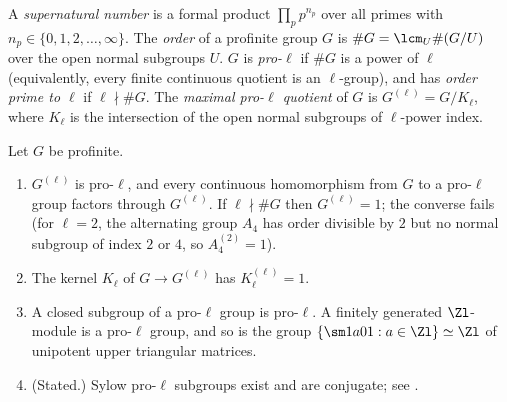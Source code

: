 \begin{definition}\label{def:cohomology:supernatural}
A \emph{supernatural number} is a formal product $\prod_pp^{n_p}$ over all primes with $n_p\in\{0,1,2,\dots,\infty\}$. The \emph{order} of a profinite group $G$ is
$\#G=\lcm_U\#(G/U)$ over the open normal subgroups $U$. $G$ is \emph{pro-$\ell$} if $\#G$ is a power of $\ell$ (equivalently, every finite continuous quotient
is an $\ell$-group), and has \emph{order prime to $\ell$} if $\ell\nmid\#G$. The \emph{maximal pro-$\ell$ quotient} of $G$ is $G^{(\ell)}=G/K_\ell$, where $K_\ell$ is
the intersection of the open normal subgroups of $\ell$-power index.
\end{definition}

\begin{lemma}\label{lem:cohomology:pro-l}
Let $G$ be profinite.
\begin{enumerate}[label=(\roman*)]
\item $G^{(\ell)}$ is pro-$\ell$, and every continuous homomorphism from $G$ to a pro-$\ell$ group factors through $G^{(\ell)}$. If $\ell\nmid\#G$ then $G^{(\ell)}=1$;
the converse fails (for $\ell=2$, the alternating group $A_4$ has order divisible by $2$ but no normal subgroup of index $2$ or $4$, so $A_4^{(2)}=1$).
\item The kernel $K_\ell$ of $G\to G^{(\ell)}$ has $K_\ell^{(\ell)}=1$.
\item A closed subgroup of a pro-$\ell$ group is pro-$\ell$. A finitely generated $\Zl$-module is a pro-$\ell$ group, and so is the group
$\{\sm1a01:a\in\Zl\}\simeq\Zl$ of unipotent upper triangular matrices.
\item (Stated.) Sylow pro-$\ell$ subgroups exist and are conjugate; see \cite[Chapter I, Section 1]{SerreGaloisCoh}.
\end{enumerate}
\end{lemma}

